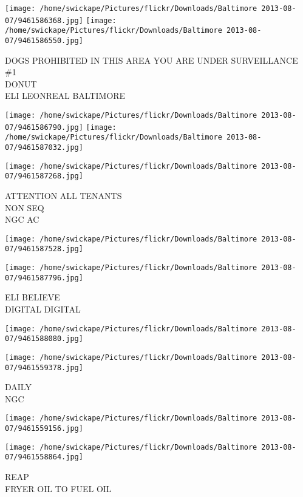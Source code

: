 \documentclass[10pt,letterpaper]{article}
\begin{document}
\texttt{[image: /home/swickape/Pictures/flickr/Downloads/Baltimore 2013-08-07/9461586368.jpg]}
\texttt{[image: /home/swickape/Pictures/flickr/Downloads/Baltimore 2013-08-07/9461586550.jpg]}

DOGS PROHIBITED IN THIS AREA YOU ARE UNDER SURVEILLANCE\\
\#1\\
DONUT\\
ELI LEONREAL BALTIMORE
\pagebreak

\texttt{[image: /home/swickape/Pictures/flickr/Downloads/Baltimore 2013-08-07/9461586790.jpg]}
\texttt{[image: /home/swickape/Pictures/flickr/Downloads/Baltimore 2013-08-07/9461587032.jpg]}

\vspace{0.25in}
\texttt{[image: /home/swickape/Pictures/flickr/Downloads/Baltimore 2013-08-07/9461587268.jpg]}

ATTENTION ALL TENANTS\\
NON SEQ\\
NGC AC
\pagebreak

\texttt{[image: /home/swickape/Pictures/flickr/Downloads/Baltimore 2013-08-07/9461587528.jpg]}

\vspace{0.25in}
\texttt{[image: /home/swickape/Pictures/flickr/Downloads/Baltimore 2013-08-07/9461587796.jpg]}

ELI BELIEVE\\
DIGITAL DIGITAL
\pagebreak

\texttt{[image: /home/swickape/Pictures/flickr/Downloads/Baltimore 2013-08-07/9461588080.jpg]}

\vspace{0.25in}
\texttt{[image: /home/swickape/Pictures/flickr/Downloads/Baltimore 2013-08-07/9461559378.jpg]}

DAILY\\
NGC
\pagebreak

\texttt{[image: /home/swickape/Pictures/flickr/Downloads/Baltimore 2013-08-07/9461559156.jpg]}

\vspace{0.25in}
\texttt{[image: /home/swickape/Pictures/flickr/Downloads/Baltimore 2013-08-07/9461558864.jpg]}

REAP\\
FRYER OIL TO FUEL OIL
\pagebreak
\end{document}
